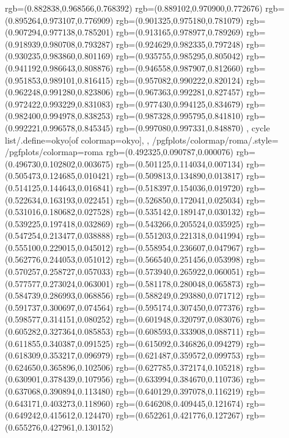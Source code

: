 {{{			rgb=(0.882838,0.968566,0.768392)
			rgb=(0.889102,0.970900,0.772676)
			rgb=(0.895264,0.973107,0.776909)
			rgb=(0.901325,0.975180,0.781079)
			rgb=(0.907294,0.977138,0.785201)
			rgb=(0.913165,0.978977,0.789269)
			rgb=(0.918939,0.980708,0.793287)
			rgb=(0.924629,0.982335,0.797248)
			rgb=(0.930235,0.983860,0.801169)
			rgb=(0.935755,0.985295,0.805042)
			rgb=(0.941192,0.986643,0.808876)
			rgb=(0.946558,0.987907,0.812660)
			rgb=(0.951853,0.989101,0.816415)
			rgb=(0.957082,0.990222,0.820124)
			rgb=(0.962248,0.991280,0.823806)
			rgb=(0.967363,0.992281,0.827457)
			rgb=(0.972422,0.993229,0.831083)
			rgb=(0.977430,0.994125,0.834679)
			rgb=(0.982400,0.994978,0.838253)
			rgb=(0.987328,0.995795,0.841810)
			rgb=(0.992221,0.996578,0.845345)
			rgb=(0.997080,0.997331,0.848870)
		},
	cycle list/.define={okyo}{[of colormap=okyo]},
	},
	/pgfplots/colormap/roma/.style={
		/pgfplots/colormap={roma}{%
			rgb=(0.492325,0.090787,0.000076)
			rgb=(0.496730,0.102802,0.003675)
			rgb=(0.501125,0.114034,0.007134)
			rgb=(0.505473,0.124685,0.010421)
			rgb=(0.509813,0.134890,0.013817)
			rgb=(0.514125,0.144643,0.016841)
			rgb=(0.518397,0.154036,0.019720)
			rgb=(0.522634,0.163193,0.022451)
			rgb=(0.526850,0.172041,0.025034)
			rgb=(0.531016,0.180682,0.027528)
			rgb=(0.535142,0.189147,0.030132)
			rgb=(0.539225,0.197418,0.032869)
			rgb=(0.543266,0.205524,0.035925)
			rgb=(0.547254,0.213477,0.038888)
			rgb=(0.551203,0.221318,0.041994)
			rgb=(0.555100,0.229015,0.045012)
			rgb=(0.558954,0.236607,0.047967)
			rgb=(0.562776,0.244053,0.051012)
			rgb=(0.566540,0.251456,0.053998)
			rgb=(0.570257,0.258727,0.057033)
			rgb=(0.573940,0.265922,0.060051)
			rgb=(0.577577,0.273024,0.063001)
			rgb=(0.581178,0.280048,0.065873)
			rgb=(0.584739,0.286993,0.068856)
			rgb=(0.588249,0.293880,0.071712)
			rgb=(0.591737,0.300697,0.074564)
			rgb=(0.595174,0.307450,0.077376)
			rgb=(0.598577,0.314151,0.080252)
			rgb=(0.601948,0.320797,0.083076)
			rgb=(0.605282,0.327364,0.085853)
			rgb=(0.608593,0.333908,0.088711)
			rgb=(0.611855,0.340387,0.091525)
			rgb=(0.615092,0.346826,0.094279)
			rgb=(0.618309,0.353217,0.096979)
			rgb=(0.621487,0.359572,0.099753)
			rgb=(0.624650,0.365896,0.102506)
			rgb=(0.627785,0.372174,0.105218)
			rgb=(0.630901,0.378439,0.107956)
			rgb=(0.633994,0.384670,0.110736)
			rgb=(0.637068,0.390894,0.113480)
			rgb=(0.640129,0.397078,0.116219)
			rgb=(0.643171,0.403273,0.118960)
			rgb=(0.646208,0.409445,0.121674)
			rgb=(0.649242,0.415612,0.124470)
			rgb=(0.652261,0.421776,0.127267)
			rgb=(0.655276,0.427961,0.130152)
}}}
